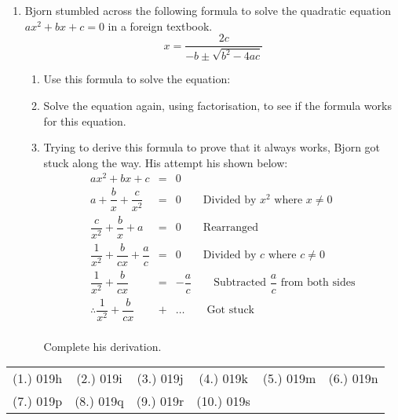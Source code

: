 \begin{eocexercises}{}
\begin{enumerate}
\item{Bjorn stumbled across the following formula to solve
the quadratic equation $ax^2+bx+c=0$ in a foreign textbook.
$$x = \dfrac{2c}{-b \pm \sqrt{b^2 - 4ac}}$$}
\begin{enumerate}
\item{Use this formula to solve the equation:
}
\item{Solve the equation again, using factorisation, to see if the formula works for this equation.}
\item{Trying to derive this formula to prove that it always works, Bjorn got stuck along the way. His attempt his shown
below:}
\begin{eqnarray*}
ax^2 + bx + c &=& 0 \\
a + \dfrac{b}{x} + \dfrac{c}{x^2} &=& 0 \qquad \mbox{Divided by $x^2$ where $x \ne 0$} \\
\dfrac{c}{x^2} + \dfrac{b}{x} + a &=& 0 \qquad \mbox{Rearranged}\\
\dfrac{1}{x^2} + \dfrac{b}{cx} + \dfrac{a}{c} &=& 0 \qquad \mbox{Divided by $c$ where $c \ne 0$}\\
\dfrac{1}{x^2} + \dfrac{b}{cx} &=& -\dfrac{a}{c} \qquad \mbox{Subtracted $\dfrac{a}{c}$ from both sides} \\
\therefore \dfrac{1}{x^2} + \dfrac{b}{cx} &+& \ldots \qquad \mbox{Got stuck}
\end{eqnarray*}
\\
Complete his derivation.
\end{enumerate}

\end{enumerate}

\par \practiceinfo
\par \begin{tabular}[h]{cccccc}
(1.)	019h	&
(2.)	019i	&
(3.)	019j	&
(4.)	019k	&
(5.)	019m	&
(6.)	019n	\\ %
(7.)	019p	&
(8.)	019q	&
(9.)	019r	&
(10.)	019s	&
\end{tabular}
\end{eocexercises}




